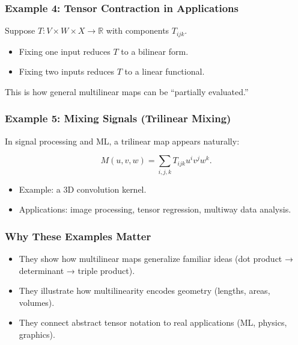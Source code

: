 \documentclass[
  letterpaper,
  DIV=11,
  numbers=noendperiod]{scrreprt}
\providecommand{\tightlist}{%
  \setlength{\itemsep}{0pt}\setlength{\parskip}{0pt}}
\begin{document}
\subsubsection{Example 4: Tensor Contraction in
Applications}\label{example-4-tensor-contraction-in-applications}

Suppose \(T: V \times W \times X \to \mathbb{R}\) with components
\(T_{ijk}\).

\begin{itemize}
\tightlist
\item
  Fixing one input reduces \(T\) to a bilinear form.
\item
  Fixing two inputs reduces \(T\) to a linear functional.
\end{itemize}

This is how general multilinear maps can be ``partially evaluated.''

\subsubsection{Example 5: Mixing Signals (Trilinear
Mixing)}\label{example-5-mixing-signals-trilinear-mixing}

In signal processing and ML, a trilinear map appears naturally:

\[
M(u,v,w) = \sum_{i,j,k} T_{ijk} u^i v^j w^k.
\]

\begin{itemize}
\tightlist
\item
  Example: a 3D convolution kernel.
\item
  Applications: image processing, tensor regression, multiway data
  analysis.
\end{itemize}

\subsubsection{Why These Examples
Matter}\label{why-these-examples-matter}

\begin{itemize}
\tightlist
\item
  They show how multilinear maps generalize familiar ideas (dot product
  → determinant → triple product).
\item
  They illustrate how multilinearity encodes geometry (lengths, areas,
  volumes).
\item
  They connect abstract tensor notation to real applications (ML,
  physics, graphics).
\end{itemize}
\end{document}
